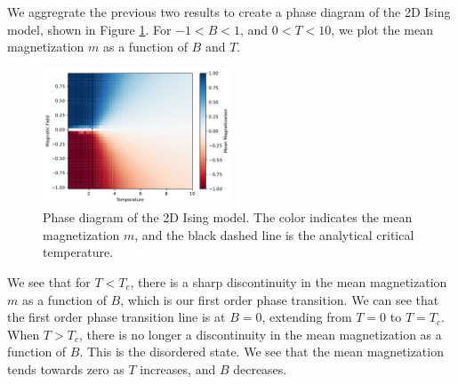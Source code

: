 \documentclass[
 reprint,
 amsmath,
 amssymb,
 aps,
]{revtex4-2}
\begin{document}
We aggregrate the previous two results to create a phase diagram of the 
2D Ising model, shown in Figure \ref{fig:phase}.
For $ -1 < B < 1 $, and $ 0 < T < 10 $,
we plot the mean magnetization $ m $ as a function of $ B $ and $ T $.

\begin{figure}[ht]
\centering
\includegraphics[width=0.5\textwidth]{figures/phase.pdf}
\caption{Phase diagram of the 2D Ising model.
The color indicates the mean magnetization $ m $, 
and the black dashed line is the analytical critical temperature.}
\label{fig:phase}
\end{figure}

We see that for $ T < T_{c} $,
there is a sharp discontinuity in the mean magnetization $ m $ 
as a function of $ B $, which is our first order phase transition.
We can see that the first order phase transition line is at $ B=0 $,
extending from $ T = 0 $ to $ T= T_{c} $.
When $ T > T_{c} $,
there is no longer a discontinuity in the mean magnetization 
as a function of $ B $.
This is the disordered state. 
We see that the mean magnetization tends towards zero as $ T $ increases,
and $ B $ decreases.
\end{document}
